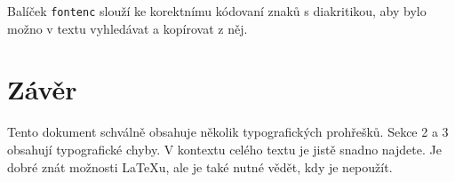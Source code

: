 \documentclass[10pt,twocolumn,a4paper]{article}
\begin{document}
Balíček \texttt{fontenc} slouží ke korektnímu kódovaní znaků s diakritikou, aby bylo možno v textu vyhledávat a kopírovat z něj.

\section{Závěr}
Tento dokument schválně obsahuje několik typografických prohřešků.
Sekce 2 a 3 obsahují typografické chyby.
V kontextu celého textu je jistě snadno najdete.
Je dobré znát možnosti \LaTeX u, ale je také nutné vědět, kdy je nepoužít.
\end{document}

